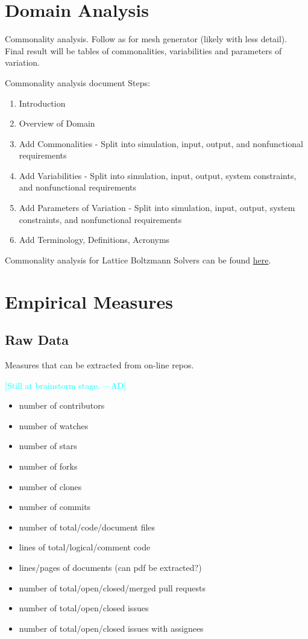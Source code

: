 \documentclass[letterpaper,cleveref]{lipics-v2019}
\newcommand{\authornote}[3]{\textcolor{#1}{[#3 ---#2]}}
\newcommand{\authornote}[3]{}
\newcommand{\ad}[1]{\authornote{cyan}{AD}{#1}} %
\theoremstyle{definition}
\begin{document}
\section{Domain Analysis} \label{SecDomainAnalysis}

Commonality analysis.  Follow as for mesh generator (likely with less detail).
Final result will be tables of commonalities, variabilities and parameters of
variation.

Commonality analysis document Steps:
\begin{enumerate}
\item Introduction
\item Overview of Domain
\item Add Commonalities - Split into simulation, input, output, and
  nonfunctional requirements
\item Add Variabilities - Split into simulation, input, output, system
  constraints, and nonfunctional requirements
\item Add Parameters of Variation - Split into simulation, input, output, system
  constraints, and nonfunctional requirements
\item Add Terminology, Definitions, Acronyms
\end{enumerate}

Commonality analysis for Lattice Boltzmann Solvers can be found
\href{run:../Peter-Notes/Commonality-Analysis-LB-Systems.pdf}{here}.

\section{Empirical Measures}

\subsection{Raw Data}
Measures that can be extracted from on-line repos.

\ad{Still at brainstorm stage.}
\begin{itemize}
\item number of contributors
\item number of watches
\item number of stars
\item number of forks
\item number of clones
\item number of commits
\item number of total/code/document files
\item lines of total/logical/comment code
\item lines/pages of documents (can pdf be extracted?)
\item number of total/open/closed/merged pull requests
\item number of total/open/closed issues
\item number of total/open/closed issues with assignees
\end{itemize}
\end{document}
